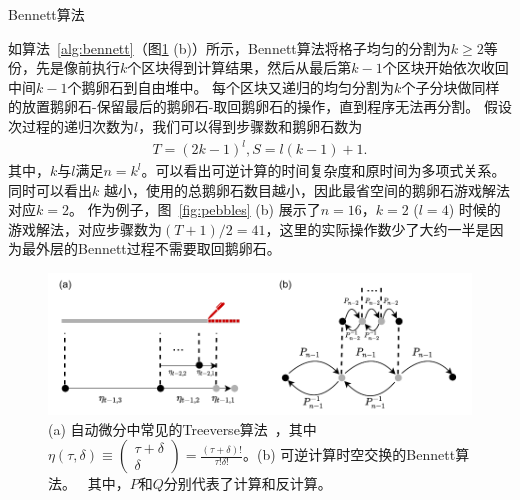\documentclass[A4,twoside,fontset=ubuntu,UTF8]{ctexart}
\begin{document}
\begin{algorithm}
    \SetAlgoLined
    \DontPrintSemicolon
    \caption{Bennett算法}\label{alg:bennett}
\end{algorithm}
如算法~\ref{alg:bennett}（图\ref{fig:tradeoff} (b)）所示，Bennett算法将格子均匀的分割为$k\geq 2$等份，先是像前执行$k$个区块得到计算结果，然后从最后第$k-1$个区块开始依次收回中间$k-1$个鹅卵石到自由堆中。
每个区块又递归的均匀分割为$k$个子分块做同样的放置鹅卵石-保留最后的鹅卵石-取回鹅卵石的操作，直到程序无法再分割。
假设次过程的递归次数为$l$，我们可以得到步骤数和鹅卵石数为
\begin{align}\label{eq:rev}
    T = (2k-1)^l, S = l(k-1)+1.
\end{align}
其中，$k$与$l$满足$n = k^l$。可以看出可逆计算的时间复杂度和原时间为多项式关系。
同时可以看出$k$ 越小，使用的总鹅卵石数目越小，因此最省空间的鹅卵石游戏解法对应$k=2$。
作为例子，图~\ref{fig:pebbles} (b) 展示了$n=16$，$k=2$ ($l=4$) 时候的游戏解法，对应步骤数为$(T+1)/2 = 41$，这里的实际操作数少了大约一半是因为最外层的Bennett过程不需要取回鹅卵石。

\begin{figure}
    \centerline{\includegraphics[width=0.88\columnwidth,trim={0 0cm 0 0cm},clip]{tradeoff2.pdf}}
    \caption{(a) 自动微分中常见的Treeverse算法~\cite{Griewank1992}，其中$\eta(\tau, \delta) \equiv \left(\begin{matrix} \tau + \delta \\ \delta \end{matrix}\right)=\frac{(\tau+\delta)!}{\tau!\delta!}$。(b) 可逆计算时空交换的Bennett算法。~\cite{Bennett1973,Levine1990} 其中，$P$和$Q$分别代表了计算和反计算。}\label{fig:tradeoff}
\end{figure}
\end{document}
